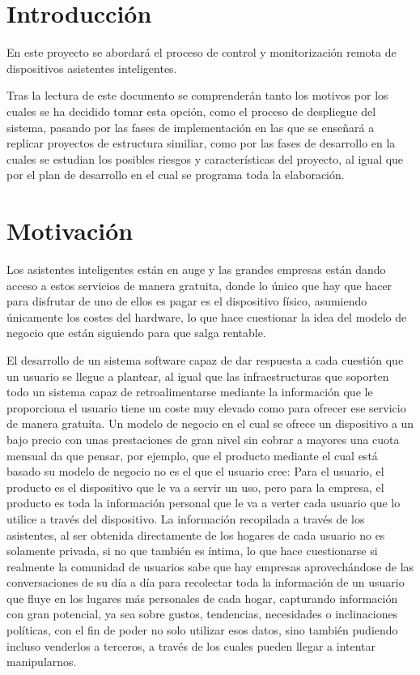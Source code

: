 \section{Introducción}

En este proyecto se abordará el proceso de control y monitorización remota de dispositivos asistentes inteligentes.

Tras la lectura de este documento se comprenderán tanto los motivos por los cuales se ha decidido tomar esta opción, como el proceso de despliegue del sistema, pasando por las fases de implementación en las que se enseñará a replicar proyectos de estructura similiar, como por las fases de desarrollo en la cuales se estudian los posibles riesgos y características del proyecto, al igual que por el plan de desarrollo en el cual se programa toda la elaboración.

\section{Motivación}

Los asistentes inteligentes están en auge y las grandes empresas están dando acceso a estos servicios de manera gratuita, donde lo único que hay que hacer para disfrutar de uno de ellos es pagar es el dispositivo físico, asumiendo únicamente los costes del hardware, lo que hace cuestionar la idea del modelo de negocio que están siguiendo para que salga rentable.

El desarrollo de un sistema software capaz de dar respuesta a cada cuestión que un usuario se llegue a plantear, al igual que las infraestructuras que soporten todo un sistema capaz de retroalimentarse mediante la información que le proporciona el usuario tiene un coste muy elevado como para ofrecer ese servicio de manera gratuíta. Un modelo de negocio en el cual  se ofrece un dispositivo a un bajo precio con unas prestaciones de gran nivel sin cobrar a mayores una cuota mensual da que pensar, por ejemplo, que el producto mediante el cual está basado su modelo de negocio no es el que el usuario cree: Para el usuario, el producto es el dispositivo que le va a servir un uso, pero para la empresa, el producto es toda la información personal que le va a verter cada usuario que lo utilice a través del dispositivo. La información recopilada a través de los asistentes, al ser obtenida directamente de los hogares de cada usuario no es solamente privada, si no que también es íntima, lo que hace cuestionarse si realmente la comunidad de usuarios sabe que hay empresas aprovechándose de las conversaciones de su día a día para recolectar toda la información de un usuario que fluye en los lugares más personales de cada hogar, capturando información con gran potencial, ya sea sobre gustos, tendencias, necesidades o inclinaciones políticas, con el fin de poder no solo utilizar esos datos, sino también pudiendo incluso venderlos a terceros, a través de los cuales pueden llegar a intentar manipularnos.

